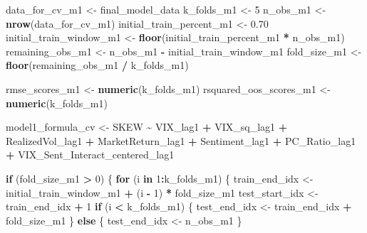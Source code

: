 \documentclass[
]{article}
\newenvironment{Shaded}{\begin{snugshade}}{\end{snugshade}}
\newcommand{\ControlFlowTok}[1]{\textcolor[rgb]{0.13,0.29,0.53}{\textbf{#1}}}
\newcommand{\DecValTok}[1]{\textcolor[rgb]{0.00,0.00,0.81}{#1}}
\newcommand{\FloatTok}[1]{\textcolor[rgb]{0.00,0.00,0.81}{#1}}
\newcommand{\FunctionTok}[1]{\textcolor[rgb]{0.13,0.29,0.53}{\textbf{#1}}}
\newcommand{\NormalTok}[1]{#1}
\newcommand{\OtherTok}[1]{\textcolor[rgb]{0.56,0.35,0.01}{#1}}
\newcommand{\SpecialCharTok}[1]{\textcolor[rgb]{0.81,0.36,0.00}{\textbf{#1}}}
\begin{document}
\begin{Shaded}
\begin{Highlighting}[]
\NormalTok{  data\_for\_cv\_m1 }\OtherTok{\textless{}{-}}\NormalTok{ final\_model\_data}
\NormalTok{  k\_folds\_m1 }\OtherTok{\textless{}{-}} \DecValTok{5}
\NormalTok{  n\_obs\_m1 }\OtherTok{\textless{}{-}} \FunctionTok{nrow}\NormalTok{(data\_for\_cv\_m1)}
\NormalTok{  initial\_train\_percent\_m1 }\OtherTok{\textless{}{-}} \FloatTok{0.70}
\NormalTok{  initial\_train\_window\_m1 }\OtherTok{\textless{}{-}} \FunctionTok{floor}\NormalTok{(initial\_train\_percent\_m1 }\SpecialCharTok{*}\NormalTok{ n\_obs\_m1)}
\NormalTok{  remaining\_obs\_m1 }\OtherTok{\textless{}{-}}\NormalTok{ n\_obs\_m1 }\SpecialCharTok{{-}}\NormalTok{ initial\_train\_window\_m1}
\NormalTok{  fold\_size\_m1 }\OtherTok{\textless{}{-}} \FunctionTok{floor}\NormalTok{(remaining\_obs\_m1 }\SpecialCharTok{/}\NormalTok{ k\_folds\_m1)}
  
\NormalTok{  rmse\_scores\_m1 }\OtherTok{\textless{}{-}} \FunctionTok{numeric}\NormalTok{(k\_folds\_m1)}
\NormalTok{  rsquared\_oos\_scores\_m1 }\OtherTok{\textless{}{-}} \FunctionTok{numeric}\NormalTok{(k\_folds\_m1)}
  
\NormalTok{  model1\_formula\_cv }\OtherTok{\textless{}{-}}\NormalTok{ SKEW }\SpecialCharTok{\textasciitilde{}}\NormalTok{ VIX\_lag1 }\SpecialCharTok{+}\NormalTok{ VIX\_sq\_lag1 }\SpecialCharTok{+}\NormalTok{ RealizedVol\_lag1 }\SpecialCharTok{+}
\NormalTok{                              MarketReturn\_lag1 }\SpecialCharTok{+}\NormalTok{ Sentiment\_lag1 }\SpecialCharTok{+}\NormalTok{ PC\_Ratio\_lag1 }\SpecialCharTok{+}
\NormalTok{                              VIX\_Sent\_Interact\_centered\_lag1}
  
  \ControlFlowTok{if}\NormalTok{ (fold\_size\_m1 }\SpecialCharTok{\textgreater{}} \DecValTok{0}\NormalTok{) \{}
    \ControlFlowTok{for}\NormalTok{ (i }\ControlFlowTok{in} \DecValTok{1}\SpecialCharTok{:}\NormalTok{k\_folds\_m1) \{}
\NormalTok{      train\_end\_idx }\OtherTok{\textless{}{-}}\NormalTok{ initial\_train\_window\_m1 }\SpecialCharTok{+}\NormalTok{ (i }\SpecialCharTok{{-}} \DecValTok{1}\NormalTok{) }\SpecialCharTok{*}\NormalTok{ fold\_size\_m1}
\NormalTok{      test\_start\_idx }\OtherTok{\textless{}{-}}\NormalTok{ train\_end\_idx }\SpecialCharTok{+} \DecValTok{1}
      \ControlFlowTok{if}\NormalTok{ (i }\SpecialCharTok{\textless{}}\NormalTok{ k\_folds\_m1) \{}
\NormalTok{        test\_end\_idx }\OtherTok{\textless{}{-}}\NormalTok{ train\_end\_idx }\SpecialCharTok{+}\NormalTok{ fold\_size\_m1}
\NormalTok{      \} }\ControlFlowTok{else}\NormalTok{ \{}
\NormalTok{        test\_end\_idx }\OtherTok{\textless{}{-}}\NormalTok{ n\_obs\_m1}
\NormalTok{      \}}
  

\end{Highlighting}
\end{Shaded}
\end{document}
